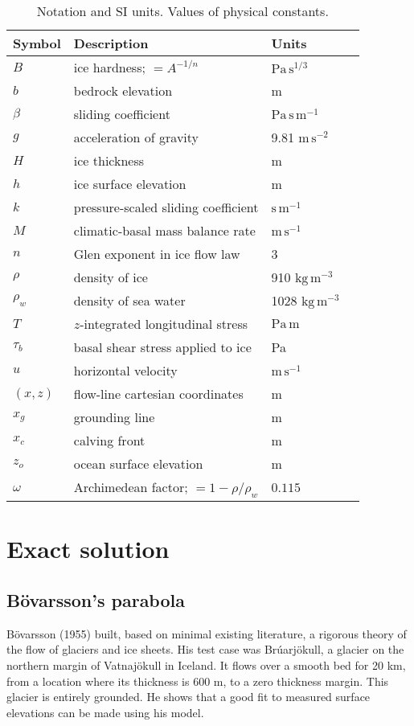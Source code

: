 \documentclass[twocolumn]{igs}
\renewcommand{\dh}{\fontencoding{T1}\selectfont{\symbol{240}}}
\newcommand{\bod}{B\"o\dh varsson\xspace}
\newcommand{\citebod}{B\"o\dh varsson (1955)\nocite{Bodvardsson}\xspace}
\begin{document}
\begin{table}
\caption{Notation and SI units.  Values of physical constants.}\label{tab:notation}

\medskip
\begin{tabular}{llll}
Symbol & Description & Units \\ \hline
$B$ & ice hardness; $=A^{-1/n}$ & $\text{Pa}\,\text{s}^{1/3}$  \\
$b$ & bedrock elevation & m \\
$\beta$ & sliding coefficient & $\text{Pa}\,\text{s}\,\text{m}^{-1}$ \\
$g$ & acceleration of gravity  & 9.81 $\text{m}\,\text{s}^{-2}$\\
$H$ & ice thickness & m \\
$h$ & ice surface elevation & m \\
$k$ & pressure-scaled sliding coefficient  & $\text{s}\,\text{m}^{-1}$ \\
$M$ & climatic-basal mass balance rate & $\text{m}\,\text{s}^{-1}$ \\
$n$ & Glen exponent in ice flow law & 3 \\
$\rho$ & density of ice & 910 $\text{kg}\,\text{m}^{-3}$ \\
$\rho_w$ & density of sea water & 1028 $\text{kg}\,\text{m}^{-3}$ \\
$T$ & $z$-integrated longitudinal stress & $\text{Pa}\,\text{m}$ \\
$\tau_{b}$ & basal shear stress applied to ice & Pa \\
$u$ & horizontal velocity & $\text{m}\,\text{s}^{-1}$ \\
$(x,z)$ & flow-line cartesian coordinates & m  \\
$x_g$ & grounding line & m  \\
$x_c$ & calving front & m  \\
$z_o$ & ocean surface elevation & m \\
$\omega$ & Archimedean factor; $=1 - \rho/\rho_w$ & $0.115$
\end{tabular}
\end{table}


\section{Exact solution}

\subsection*{\bod's parabola}  \citebod built, based on minimal existing literature, a rigorous theory of the flow of glaciers and ice sheets.  His test case was Br\'uarj\"okull, a glacier on the northern margin of Vatnaj\"okull in Iceland.  It flows over a smooth bed for 20 km, from a location where its thickness is 600 m, to a zero thickness margin.  This glacier is entirely grounded.  He shows that a good fit to measured surface elevations can be made using his model.
\end{document}
